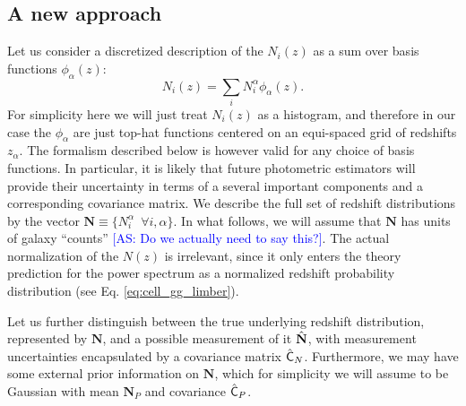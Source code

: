\documentclass[a4paper,11pt]{article}
\newcommand{\as}[1]{{\textcolor{blue}{[AS: #1]}}}
\newcommand{\vN}{\mathbf{N}}
\begin{document}
    \subsection{A new approach}\label{ssec:theory.nz_new}
      Let us consider a discretized description of the $N_i(z)$ as a sum over basis functions $\phi_\alpha(z)$:
      \begin{equation}
        N_i(z)=\sum_i N^\alpha_i\phi_\alpha(z).
      \end{equation}
      For simplicity here we will just treat $N_i(z)$ as a histogram, and therefore in our case the $\phi_\alpha$ are just top-hat functions centered on an equi-spaced grid of redshifts $z_\alpha$. The formalism described below is however valid for any choice of basis functions. In particular, it is likely that future photometric estimators will provide their uncertainty in terms of a several important components and a corresponding covariance matrix.    We describe the full set of redshift distributions by the vector $\vN\equiv\{N^\alpha_i\,\,\,\forall i,\alpha\}$. In what follows, we will assume that $\vN$ has units of galaxy ``counts'' \as{Do we actually need to say this?}. The actual normalization of the $N(z)$ is irrelevant, since it only enters the theory prediction for the power spectrum as a normalized redshift probability distribution (see Eq. \ref{eq:cell_gg_limber}).

      Let us further distinguish between the true underlying redshift distribution, represented by $\vN$, and a possible measurement of it $\hat{\bf N}$, with measurement uncertainties encapsulated by a covariance matrix $\hat{\sf C}_N$. Furthermore, we may have some external prior information on $\vN$, which for simplicity we will assume to be Gaussian with mean $\vN_P$ and covariance $\hat{\sf C}_P$.
      
\end{document}

